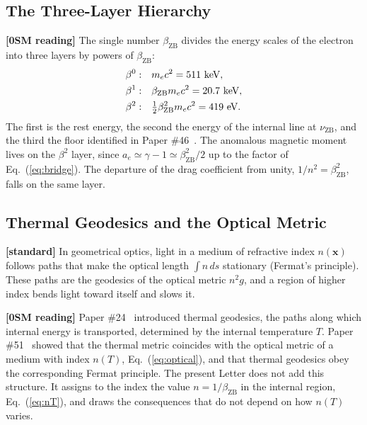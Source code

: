 \documentclass[%
 reprint, amsmath,amssymb, aps, prb, ]{revtex4-2}
\numberwithin{equation}{section}
\begin{document}
\subsection{The Three-Layer Hierarchy}
\label{app:layers}

\textbf{[0SM reading]} The single number $\beta_{\text{ZB}}$ divides the energy scales of the electron into three layers by powers of $\beta_{\text{ZB}}$:
\begin{align}
\beta^0:&\quad m_ec^2 = 511\ \text{keV},
\notag\\
\beta^1:&\quad \beta_{\text{ZB}}m_ec^2 = 20.7\ \text{keV},
\notag\\
\beta^2:&\quad \tfrac12\beta_{\text{ZB}}^2m_ec^2 = 419\ \text{eV}.
\label{eq:layers}
\end{align}
The first is the rest energy, the second the energy of the internal line at $\nu_{\text{ZB}}$, and the third the floor identified in Paper \#46~\cite{H46}. The anomalous magnetic moment lives on the $\beta^2$ layer, since $a_e \simeq \gamma - 1 \simeq \beta_{\text{ZB}}^2/2$ up to the factor of Eq.~(\ref{eq:bridge}). The departure of the drag coefficient from unity, $1/n^2 = \beta_{\text{ZB}}^2$, falls on the same layer.

\subsection{Thermal Geodesics and the Optical Metric}
\label{app:optical}

\textbf{[standard]} In geometrical optics, light in a medium of refractive index $n(\bm{x})$ follows paths that make the optical length $\int n\,ds$ stationary (Fermat's principle). These paths are the geodesics of the optical metric $n^2 g$, and a region of higher index bends light toward itself and slows it.

\textbf{[0SM reading]} Paper \#24~\cite{H24} introduced thermal geodesics, the paths along which internal energy is transported, determined by the internal temperature $T$. Paper \#51~\cite{H51} showed that the thermal metric coincides with the optical metric of a medium with index $n(T)$, Eq.~(\ref{eq:optical}), and that thermal geodesics obey the corresponding Fermat principle. The present Letter does not add this structure. It assigns to the index the value $n = 1/\beta_{\text{ZB}}$ in the internal region, Eq.~(\ref{eq:nT}), and draws the consequences that do not depend on how $n(T)$ varies.
\end{document}

